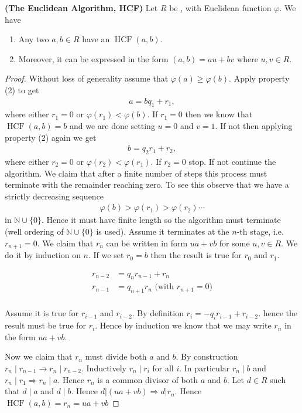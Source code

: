\documentclass{article}
\newcommand{\bfs}[1]{\textbf{({#1}) }}
\newcommand{\HCF}{\operatorname{HCF}}
\begin{document}
\begin{thma}\bfs{The Euclidean Algorithm, HCF}
Let $R$ be , with Euclidean function $\varphi$.  We have 
\begin{enumerate}
    \item Any two $a, b \in R$ have an $\HCF(a, b)$. 
    \item Moreover, it can be expressed in the form $(a, b)=a u+b v$ where $u, v \in R$.
\end{enumerate}
\end{thma}
\begin{proof}
Without loss of generality assume that $\varphi(a) \geq \varphi(b)$. Apply property (2) to get
\begin{align*}
a=b q_{1}+r_{1},
\end{align*}
where either $r_{1}=0$ or $\varphi\left(r_{1}\right)<\varphi(b)$. If $r_{1}=0$ then we know that $\HCF(a, b)=b$ and we are done setting $u=0$ and $v=1$. If not then applying property (2) again we get
\begin{align*}
b=q_{2} r_{1}+r_{2},
\end{align*}
where either $r_{2}=0$ or $\varphi\left(r_{2}\right)<\varphi\left(r_{1}\right)$. If $r_{2}=0$ stop. If not continue the algorithm. We claim that after a finite number of steps this process must terminate with the remainder reaching zero. To see this observe that we have a strictly decreasing sequence
\begin{align*}
\varphi(b)>\varphi\left(r_{1}\right)>\varphi\left(r_{2}\right) \cdots
\end{align*}
in $\mathbb{N} \cup\{0\}$. Hence it must have finite length so the algorithm must terminate (well ordering of $\mathbb{N} \cup\{0\}$ is used). Assume it terminates at the $n$-th stage, i.e. $r_{n+1}=0$. We claim that $r_{n}$ can be written in form $u a+v b$ for some $u, v \in R$. We do it by induction on $n$. If we set $r_{0}=b$ then the result is true for $r_{0}$ and $r_{1}$. 

\begin{align*}
    r_{n-2} &= q_nr_{n-1} + r_{n}\\
    r_{n-1} &= q_{n+1}r_{n} \text{ (with $r_{n+1}=0$)}\\
\end{align*}

Assume it is true for $r_{i-1}$ and $r_{i-2}$. By definition $r_{i}=-q_{i} r_{i-1}+r_{i-2}$. hence the result must be true for $r_{i}$. Hence by induction we know that we may write $r_{n}$ in the form $u a+v b$.

Now we claim that $r_{n}$ must divide both $a$ and $b$. By construction $r_{n} \mid r_{n-1} \rightarrow r_{n}\mid r_{n-2}$. Inductively $r_{n} \mid r_{i}$ for all $i$. In particular $r_{n} \mid b$ and $r_{n}\mid r_{1} \Rightarrow r_{n}\mid a$. Hence $r_{n}$ is a common divisor of both $a$ and $b$. Let $d \in R$ such that $d \mid a$ and $d \mid b$. Hence $d|(u a+v b) \Rightarrow d| r_{n}$. Hence $\HCF(a, b)=r_{n}=u a+v b$
\end{proof} 
\end{document}
